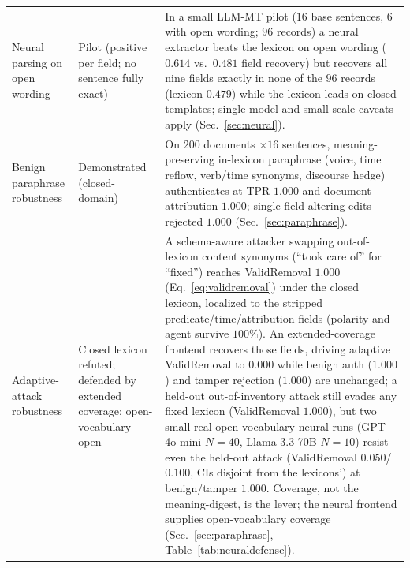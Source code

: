 \documentclass[11pt]{article}
\begin{document}
\begin{table}[t]
\begin{tabularx}{\textwidth}{@{}>{\raggedright\arraybackslash}p{3.1cm}>{\raggedright\arraybackslash}p{3.0cm}X@{}}
Neural parsing on open wording & Pilot (positive per field; no sentence fully exact) & In a small LLM-MT pilot ($16$ base sentences, $6$ with open wording; $96$ records) a neural extractor beats the lexicon on open wording ($0.614$ vs.\ $0.481$ field recovery) but recovers all nine fields exactly in none of the $96$ records (lexicon $0.479$) while the lexicon leads on closed templates; single-model and small-scale caveats apply (Sec.~\ref{sec:neural}). \\
Benign paraphrase robustness & Demonstrated (closed-domain) & On $200$ documents $\times16$ sentences, meaning-preserving in-lexicon paraphrase (voice, time reflow, verb/time synonyms, discourse hedge) authenticates at TPR $1.000$ and document attribution $1.000$; single-field altering edits rejected $1.000$ (Sec.~\ref{sec:paraphrase}). \\
Adaptive-attack robustness & Closed lexicon refuted; defended by extended coverage; open-vocabulary open & A schema-aware attacker swapping out-of-lexicon content synonyms (``took care of'' for ``fixed'') reaches ValidRemoval $1.000$ (Eq.~\ref{eq:validremoval}) under the closed lexicon, localized to the stripped predicate/time/attribution fields (polarity and agent survive $100\%$). An extended-coverage frontend recovers those fields, driving adaptive ValidRemoval to $0.000$ while benign auth ($1.000$) and tamper rejection ($1.000$) are unchanged; a held-out out-of-inventory attack still evades any fixed lexicon (ValidRemoval $1.000$), but two small real open-vocabulary neural runs (GPT-4o-mini $N{=}40$, Llama-3.3-70B $N{=}10$) resist even the held-out attack (ValidRemoval $0.050$/$0.100$, CIs disjoint from the lexicons') at benign/tamper $1.000$. Coverage, not the meaning-digest, is the lever; the neural frontend supplies open-vocabulary coverage (Sec.~\ref{sec:paraphrase}, Table~\ref{tab:neuraldefense}). \\
\bottomrule
\end{tabularx}
\end{table}
\end{document}
